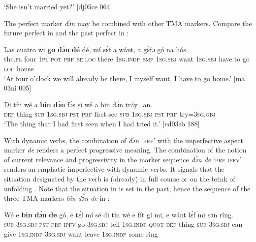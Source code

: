 \glt ‘She isn’t married yet?’ [dj05ce 064]
\z

The perfect marker \textit{dɔ́n} may be combined with other TMA markers. Compare the future perfect in  and the past perfect in : 


\ea%
    \label{ex:key:400}
    \gll Las    cuatro  wi  \textbf{go}  \textbf{dɔ́n}  \textbf{dé}    dé,    mí    sɛ́f  a    wánt,
a    gɛ́fɔ    gó  na  hós.\\
the\textsc{.pl}  four    \textsc{1pl}  \textsc{pot}  \textsc{prf}  \textsc{be.loc}  there  \textsc{1sg.indp}  \textsc{emp}  \textsc{1sg.sbj}  want
\textsc{1sg.sbj}  have.to  go  \textsc{loc}  house\\

\glt ‘At four o’clock we will already be there, I myself want, I have to go home.’ [ma 03ni 005]
\z


\ea%
    \label{ex:key:401}
    \gll Di  tín    wé  a    \textbf{bin}  \textbf{dɔ́n}  fɔ́s  sí  wé  a    bin
dɔ́n    tráy=an.\\
\textsc{def}  thing  \textsc{sub}  \textsc{1sg.sbj}  \textsc{pst}  \textsc{prf}  first  see  \textsc{sub}  \textsc{1sg.sbj}  \textsc{pst}
\textsc{prf}    try=\textsc{3sg.obj}\\

\glt ‘The thing that I had first seen when I had tried it.’ [ed03sb 188]
\z

With dynamic verbs, the combination of \textit{dɔ́n} ‘\textsc{prf}’ with the imperfective aspect marker \textit{de} renders a perfect progressive meaning. The combination of the notion of current relevance and progressivity in the marker sequence \textit{dɔ́n de} \textsc{‘prf} \textsc{ipfv’} renders an emphatic imperfective with dynamic verbs. It signals that the situation designated by the verb is (already) in full course  or on the brink of unfolding . Note that the situation in  is set in the past, hence the sequence of the three TMA markers \textit{bin} \textit{dɔ́n} \textit{de} in :


\ea%
    \label{ex:key:402}
    \gll Wé  e    \textbf{bin}  \textbf{dɔ́n}  \textbf{de}  gó,  e    tɛ́l  mí    sé  di  tín    wé
e    fít  gí  mi,    e    wánt  lɛ́f    mi    sɔn    ríng.\\
\textsc{sub}  \textsc{3sg.sbj}  \textsc{pst}  \textsc{prf}  \textsc{ipfv}  go  \textsc{3sg.sbj}  tell  \textsc{1sg.indp}  \textsc{quot}  \textsc{def}  thing  \textsc{sub}
\textsc{3sg.sbj}  can  give  \textsc{1sg.indp}  \textsc{3sg.sbj}  want  leave  \textsc{1sg.indp}  some  ring\\

